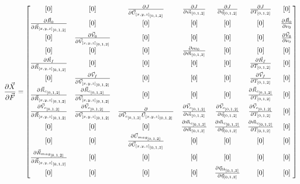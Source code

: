 \begin{equation}
\pdv{\vec{X}}{\vec{F}} = 
\begin{bmatrix}

[0] &
[0] &
\pdv{J}{\vec{U}_{[x,y,z]_{[0,1,2]}}} &
\pdv{J}{\vec{m}_{[0,1,2]}} &
\pdv{J}{\vec{\eta}_{[0,1,2]}} &
\pdv{J}{T_{[0,1,2]}} &
[0]  \\

\pdv{\vec{R}_0}{\vec{R}_{[x,y,z]_{[0,1,2]}}} &
[0] &
[0] &
[0] &
[0] &
[0] &
\pdv{\vec{R}_0}{\nu_0}  \\

[0] &
\pdv{\vec{V}_0}{\vec{V}_{[x,y,z]_{[0,1,2]}}} &
[0] &
[0] &
[0] &
[0] &
\pdv{\vec{V}_0}{\nu_0}  \\

[0] &
[0] &
[0] &
\pdv{m_0}{\vec{m}_{[0,1,2]}} &
[0] &
[0] &
[0]  \\

\pdv{\vec{R}_f}{\vec{R}_{[x,y,z]_{[0,1,2]}}} &
[0] &
[0] &
[0] &
[0] &
\pdv{\vec{R}_f}{T_{[0,1,2]}} &
[0]  \\

[0] &
\pdv{\vec{V}_f}{\vec{V}_{[x,y,z]_{[0,1,2]}}} &
[0] &
[0] &
[0] &
\pdv{\vec{V}_f}{T_{[0,1,2]}} &
[0]  \\

\pdv{\vec{R}_{c_{[0,1,2]}}}{\vec{R}_{[x,y,z]_{[0,1,2]}}} &
\pdv{\vec{R}_{c_{[0,1,2]}}}{\vec{V}_{[x,y,z]_{[0,1,2]}}} &
[0] &
[0] &
[0] &
\pdv{\vec{R}_{c_{[0,1,2]}}}{T_{[0,1,2]}} &
[0]  \\

\pdv{\vec{V}_{c_{[0,1,2]}}}{\vec{R}_{[x,y,z]_{[0,1,2]}}} &
\pdv{\vec{V}_{c_{[0,1,2]}}}{\vec{V}_{[x,y,z]_{[0,1,2]}}} &
\pdv{\vec{V}_{c_{[0,1,2]}}{\vec{U}_{[x,y,z]_{[0,1,2]}}}} &
\pdv{\vec{V}_{c_{[0,1,2]}}}{\vec{m}_{[0,1,2]}} &
\pdv{\vec{V}_{c_{[0,1,2]}}}{\vec{\eta}_{[0,1,2]}} &
\pdv{\vec{V}_{c_{[0,1,2]}}}{T_{[0,1,2]}} &
[0]  \\

[0] &
[0] &
[0] &
\pdv{\vec{m}_{c_{[0,1,2]}}}{\vec{m}_{[0,1,2]}} &
\pdv{\vec{m}_{c_{[0,1,2]}}}{\vec{\eta}_{[0,1,2]}} &
\pdv{\vec{m}_{c_{[0,1,2]}}}{T_{[0,1,2]}} &
[0]  \\

[0] &
[0] &
\pdv{\vec{U}_{mag_{[0,1,2]}}}{\vec{U}_{[x,y,z]_{[0,1,2]}}} &
[0] &
[0] &
[0] &
[0]  \\

\pdv{\vec{R}_{mag_{[0,1,2]}}}{\vec{R}_{[x,y,z]_{[0,1,2]}}} &
[0] &
[0] &
[0] &
[0] &
[0] &
[0]  \\

[0] &
[0] &
[0] &
[0] &
\pdv{\vec{\eta}_{lb_{[0,1,2]}}}{\vec{\eta}_{[0,1,2]}} &
[0] &
[0]  \\


\end{bmatrix}
\end{equation}
